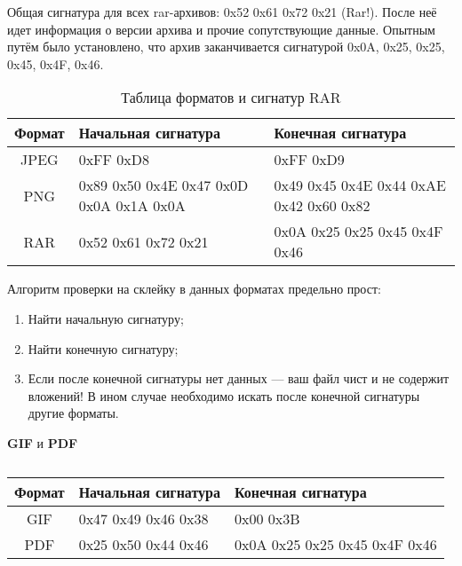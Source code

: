 Общая сигнатура для всех rar-архивов: 0x52 0x61 0x72 0x21 (Rar!). После неё
идет информация о версии архива и прочие сопутствующие данные. Опытным путём
было установлено, что архив заканчивается сигнатурой 0x0A, 0x25, 0x25, 0x45,
0x4F, 0x46.

\begin{table} [htbp]%
  \centering
    \caption{Таблица форматов и сигнатур RAR}%
    \label{tabl:tab7x1}%
    \begin{SingleSpace}
      \begin{tabularx}{\textwidth}{|c|L|L|}
      \hline
      Формат & Начальная сигнатура & Конечная сигнатура \tabularnewline \hline
      JPEG   & 0xFF 0xD8                                & 0xFF 0xD9                               \tabularnewline \hline
      PNG    & 0x89 0x50 0x4E 0x47 0x0D 0x0A 0x1A 0x0A  & 0x49 0x45 0x4E 0x44 0xAE 0x42 0x60 0x82 \tabularnewline \hline
      RAR    & 0x52 0x61 0x72 0x21                      & 0x0A 0x25 0x25 0x45 0x4F 0x46           \tabularnewline \hline
      \end{tabularx}
    \end{SingleSpace}
\end{table}

Алгоритм проверки на склейку в данных форматах предельно прост:
\begin{enumerate}
\item Найти начальную сигнатуру;
\item Найти конечную сигнатуру;
\item Если после конечной сигнатуры нет данных --- ваш файл чист и не
    содержит вложений! В ином случае необходимо искать после конечной
    сигнатуры другие форматы.
\end{enumerate}

\textbf{GIF} и \textbf{PDF}

\begin{table} [htbp]%
  \centering
    \captiondelim{ } %
    \caption{}%
    \label{tabl:tab7x2}%
    \begin{SingleSpace}
      \begin{tabularx}{\textwidth}{|c|L|L|}
        \hline
        Формат & Начальная сигнатура & Конечная сигнатура             \tabularnewline \hline
        GIF    & 0x47 0x49 0x46 0x38 & 0x00 0x3B                      \tabularnewline \hline
        PDF    & 0x25 0x50 0x44 0x46 & 0x0A 0x25 0x25 0x45 0x4F 0x46  \tabularnewline \hline
      \end{tabularx}
    \end{SingleSpace}
\end{table}




